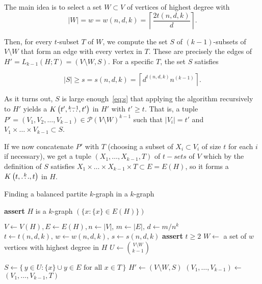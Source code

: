 The main idea is to select a set $W \subset V$ of vertices of highest degree with
\begin{equation}
    \label{eq:w}
    |W| = w = w(n, d, k) = \left\lceil \frac{2t(n, d, k)}{d} \right\rceil.
\end{equation}

Then, for every $t$-subset $T$ of $W$, we compute the set $S$ of $(k-1)$-subsets of $V \setminus W$
that form an edge with every vertex in $T$.
These are precisely the edges of $H' = L_{k-1}(H; T) = (V \setminus W, S)$.
For a specific $T$, the set $S$ satisfies

\begin{equation}
    \label{eq:s}
    |S| \geq s = s(n, d, k) = \left\lceil d^{t(n, d, k)} n^{(k-1)} \right\rceil.
\end{equation}

As it turns out, $S$ is large enough~\eqref{eq:s}
that applying the algorithm recursively to $H'$
yields a $K\left(t', \overset{k-1}{\dots}, t'\right)$ in $H'$ with $t' \geq t$.
That is, a tuple
$P' = (V_1, V_2, \dots, V_{k-1}) \in \mathcal{P}(V \setminus W)^{k-1}$ such that $|V_i| = t'$ and
$V_1 \times \dots \times V_{k-1}\subset S$.

If we now concatenate $P'$ with $T$ (choosing a subset of $X_i \subset V_i$ of size $t$ for each $i$ if necessary), we get
a tuple $(X_1, \dots, X_{k-1}, T)$ of $t-sets$ of $V$
which by the definition of $S$ satisfies
$X_1 \times \dots \times X_{k-1} \times T \subset E = E(H)$,
so it forms a $K\left(t, \overset{k}{\dots}, t\right)$ in $H$.

\begin{algorithm}[H]
    \caption{Finding a balanced partite $k$-graph in a $k$-graph}
    \label{alg:kpartite}
    \begin{algorithmic}[1]
            \State \textbf{assert} $H$ is a $k$-graph
             \label{line:base_case}
                \State \Return $(\{x \colon \{x\} \in E(H)\})$
            \EndIf

            \State $V \gets V(H), E \gets E(H), n \gets |V|,\, m \gets |E|,\, d \gets m/n^k$
            \State $t \gets t(n, d, k),\, w \gets w(n, d, k),\, s \gets s(n, d, k)$ \label{line:tws}
            \State \textbf{assert} $t \geq 2$ \label{line:min_t}
            \State $W \gets$ a set of $w$ vertices with highest degree in $H$ \label{line:W}
            \State $U \gets \binom{V\setminus W}{k-1}$

             \label{line:for}
                \State $S \gets \{\,y \in U \colon \{x\} \cup y \in E \text{ for all } x \in T\,\}$ \label{line:S}
                    \State $H' \gets (V \setminus W, S)$ \label{line:rec_call}
                    \State $(V_1, \dots, V_{k-1}) \gets$ 
                    \State \Return $(V_1, \dots, V_{k-1}, T)$ \label{line:return}
                \EndIf
            \EndFor
        \EndFunction
    \end{algorithmic}
\end{algorithm}

